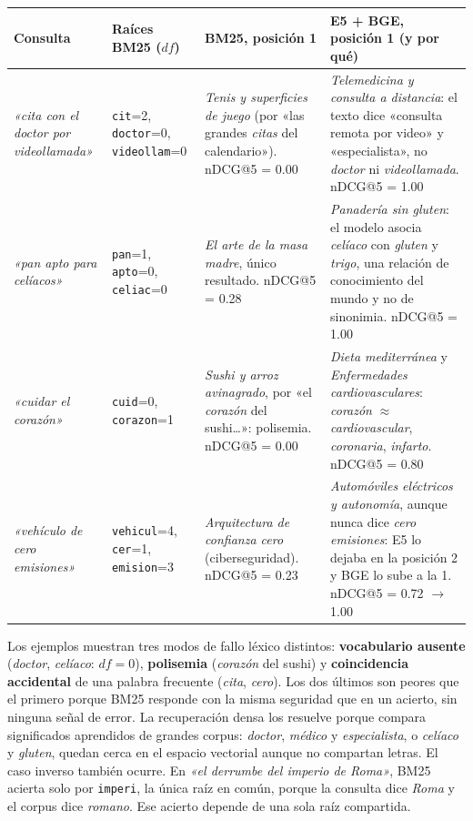 \documentclass[10pt,a4paper]{article}
\newcommand{\term}[1]{\textcolor{acento}{\texttt{#1}}}
\newcommand{\q}[1]{\emph{«#1»}}
\begin{document}
\begin{table}[H]
\centering\footnotesize
\begin{tabular}{@{}>{\raggedright\arraybackslash}p{2.9cm}>{\raggedright\arraybackslash}p{3.0cm}>{\raggedright\arraybackslash}p{4.3cm}>{\raggedright\arraybackslash}p{6.0cm}@{}}
\toprule
\textbf{Consulta} & \textbf{Raíces BM25 ($\mathit{df}$)} & \textbf{BM25, posición 1} & \textbf{E5 + BGE, posición 1 (y por qué)} \\
\midrule
\q{cita con el doctor por videollamada} & \term{cit}=2, \term{doctor}=0, \term{videollam}=0 &
\emph{Tenis y superficies de juego} (por «las grandes \emph{citas} del calendario»). nDCG@5 = 0.00 &
\emph{Telemedicina y consulta a distancia}: el texto dice «consulta remota por video» y
«especialista», no \emph{doctor} ni \emph{videollamada}. nDCG@5 = 1.00 \\
\addlinespace
\q{pan apto para celíacos} & \term{pan}=1, \term{apto}=0, \term{celiac}=0 &
\emph{El arte de la masa madre}, único resultado. nDCG@5 = 0.28 &
\emph{Panadería sin gluten}: el modelo asocia \emph{celíaco} con \emph{gluten} y \emph{trigo}, una
relación de conocimiento del mundo y no de sinonimia. nDCG@5 = 1.00 \\
\addlinespace
\q{cuidar el corazón} & \term{cuid}=0, \term{corazon}=1 &
\emph{Sushi y arroz avinagrado}, por «el \emph{corazón} del sushi…»: polisemia. nDCG@5 = 0.00 &
\emph{Dieta mediterránea} y \emph{Enfermedades cardiovasculares}: \emph{corazón} $\approx$
\emph{cardiovascular}, \emph{coronaria}, \emph{infarto}. nDCG@5 = 0.80 \\
\addlinespace
\q{vehículo de cero emisiones} & \term{vehicul}=4, \term{cer}=1, \term{emision}=3 &
\emph{Arquitectura de confianza cero} (ciberseguridad). nDCG@5 = 0.23 &
\emph{Automóviles eléctricos y autonomía}, aunque nunca dice \emph{cero emisiones}: E5 lo dejaba en la
posición 2 y BGE lo sube a la 1. nDCG@5 = 0.72 $\rightarrow$ 1.00 \\
\bottomrule
\end{tabular}
\end{table}

Los ejemplos muestran tres modos de fallo léxico distintos: \textbf{vocabulario ausente}
(\emph{doctor}, \emph{celíaco}: $\mathit{df}=0$), \textbf{polisemia} (\emph{corazón} del sushi) y
\textbf{coincidencia accidental} de una palabra frecuente (\emph{cita}, \emph{cero}). Los dos últimos son
peores que el primero porque BM25 responde con la misma seguridad que en un acierto, sin ninguna señal de
error. La recuperación densa los resuelve porque compara significados aprendidos de grandes corpus:
\emph{doctor}, \emph{médico} y \emph{especialista}, o \emph{celíaco} y \emph{gluten}, quedan cerca en el
espacio vectorial aunque no compartan letras. El caso inverso también ocurre. En \q{el derrumbe del
imperio de Roma}, BM25 acierta solo por \term{imperi}, la única raíz en común, porque la consulta dice
\emph{Roma} y el corpus dice \emph{romano}. Ese acierto depende de una sola raíz compartida.
\end{document}
